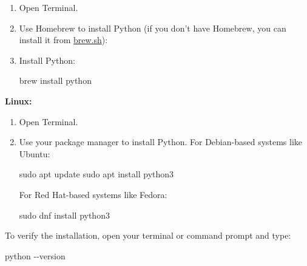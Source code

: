 \documentclass[
  letterpaper,
  DIV=11,
  numbers=noendperiod]{scrreprt}
\newenvironment{Shaded}{\begin{snugshade}}{\end{snugshade}}
\newcommand{\NormalTok}[1]{\textcolor[rgb]{0.00,0.23,0.31}{#1}}
\begin{document}
\begin{enumerate}
\def\labelenumi{\arabic{enumi}.}
\item
  Open Terminal.
\item
  Use Homebrew to install Python (if you don't have Homebrew, you can
  install it from \href{https://brew.sh/}{brew.sh}):

\begin{Shaded}
\end{Shaded}
\item
  Install Python:

\begin{Shaded}
\begin{Highlighting}[]
\NormalTok{brew install python}
\end{Highlighting}
\end{Shaded}
\end{enumerate}

\textbf{Linux:}

\begin{enumerate}
\def\labelenumi{\arabic{enumi}.}
\item
  Open Terminal.
\item
  Use your package manager to install Python. For Debian-based systems
  like Ubuntu:

\begin{Shaded}
\begin{Highlighting}[]
\NormalTok{sudo apt update}
\NormalTok{sudo apt install python3}
\end{Highlighting}
\end{Shaded}

  For Red Hat-based systems like Fedora:

\begin{Shaded}
\begin{Highlighting}[]
\NormalTok{sudo dnf install python3}
\end{Highlighting}
\end{Shaded}
\end{enumerate}

To verify the installation, open your terminal or command prompt and
type:

\begin{Shaded}
\begin{Highlighting}[]
\NormalTok{python {-}{-}version}
\end{Highlighting}
\end{Shaded}
\end{document}
